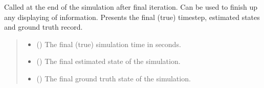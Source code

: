 \documentclass[letterpaper,10pt,english]{sphinxmanual}
\begin{document}
\begin{fulllineitems}

\begin{fulllineitems}
\label{\detokenize{modules/simulation/display:qnav.simulation.display.Display.on_finish}}
\pysigstartsignatures
{}
\pysigstopsignatures
\sphinxAtStartPar
Called at the end of the simulation after final iteration.
Can be used to finish up any displaying of information. Presents the
final (true) timestep, estimated states and ground truth record.
\begin{quote}\begin{description}
\begin{itemize}
\item {} 
\sphinxAtStartPar
{} () \textendash{} The final (true) simulation time in seconds.

\item {} 
\sphinxAtStartPar
{} ({\hyperref[\detokenize{modules/estimation/state:qnav.estimation.state.EstimatedState}]{}}) \textendash{} The final estimated state of the simulation.

\item {} 
\sphinxAtStartPar
{} ({\hyperref[\detokenize{modules/waypoints/trajectory:qnav.waypoints.trajectory.GroundTruth}]{}}) \textendash{} The final ground truth state of the simulation.

\end{itemize}

\end{description}\end{quote}

\end{fulllineitems}


\end{fulllineitems}
\end{document}
